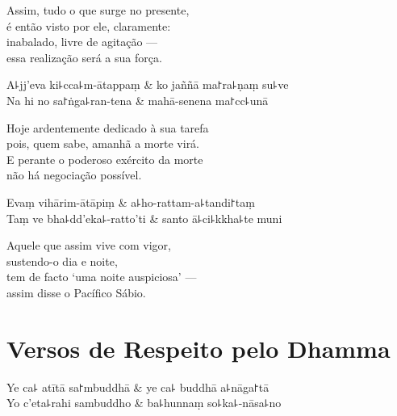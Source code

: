 \begin{english}
  Assim, tudo o que surge no presente,\\
  é então visto por ele, claramente:\\
  inabalado, livre de agitação ---\\
  essa realização será a sua força.
\end{english}

\begin{twochants}
  A꜕jj'eva ki꜕cca꜕m-ātappaṃ & ko jaññā ma꜓ra꜕ṇaṃ su꜕ve \\
  Na hi no sa꜓ṅga꜕ran-tena & mahā-senena ma꜓cc꜕unā \\
\end{twochants}

\begin{english}
  Hoje ardentemente dedicado à sua tarefa\\
  pois, quem sabe, amanhã a morte virá.\\
  E perante o poderoso exército da morte\\
  não há negociação possível.
\end{english}

\clearpage

\begin{twochants}
  Evaṃ vihārim-ātāpiṃ & a꜕ho-rattam-a꜕tandi꜓taṃ \\
  Taṃ ve bha꜕dd'eka꜕-ratto'ti & santo ā꜕ci꜕kkha꜕te muni \\
\end{twochants}

\begin{english}
  Aquele que assim vive com vigor,\\
  sustendo-o dia e noite,\\
  tem de facto `uma noite auspiciosa' ---\\
  assim disse o Pacífico Sábio.
\end{english}

\chapter{Versos de Respeito pelo Dhamma}


\begin{leader}
\end{leader}

\begin{twochants}
  Ye ca꜕ atītā sa꜓mbuddhā & ye ca꜕ buddhā a꜕nāga꜓tā \\
  Yo c'eta꜕rahi sambuddho & ba꜕hunnaṃ so꜕ka꜕-nāsa꜕no \\
\end{twochants}

